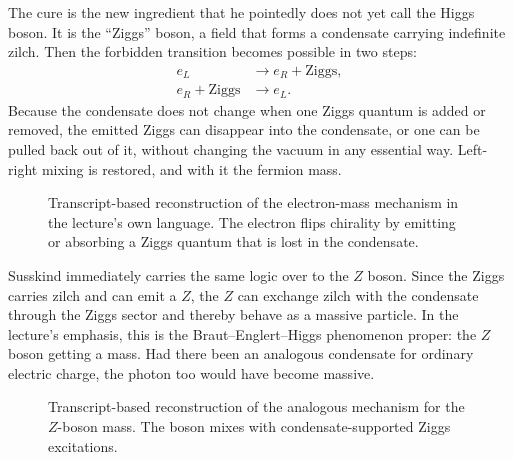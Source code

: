 The cure is the new ingredient that he pointedly does not yet call the Higgs boson. It is the ``Ziggs'' boson, a field that forms a condensate carrying indefinite zilch. Then the forbidden transition becomes possible in two steps:
\begin{align}
e_{L} &\to e_{R}+\mathrm{Ziggs},\\
e_{R}+\mathrm{Ziggs} &\to e_{L}.
\end{align}
Because the condensate does not change when one Ziggs quantum is added or removed, the emitted Ziggs can disappear into the condensate, or one can be pulled back out of it, without changing the vacuum in any essential way. Left-right mixing is restored, and with it the fermion mass.

\begin{figure}
\centering
{}
\caption{Transcript-based reconstruction of the electron-mass mechanism in the lecture's own language. The electron flips chirality by emitting or absorbing a Ziggs quantum that is lost in the condensate.}
\end{figure}

Susskind immediately carries the same logic over to the \(Z\) boson. Since the Ziggs carries zilch and can emit a \(Z\), the \(Z\) can exchange zilch with the condensate through the Ziggs sector and thereby behave as a massive particle. In the lecture's emphasis, this is the Braut--Englert--Higgs phenomenon proper: the \(Z\) boson getting a mass. Had there been an analogous condensate for ordinary electric charge, the photon too would have become massive.

\begin{figure}
\centering
{}
\caption{Transcript-based reconstruction of the analogous mechanism for the \(Z\)-boson mass. The boson mixes with condensate-supported Ziggs excitations.}
\end{figure}

